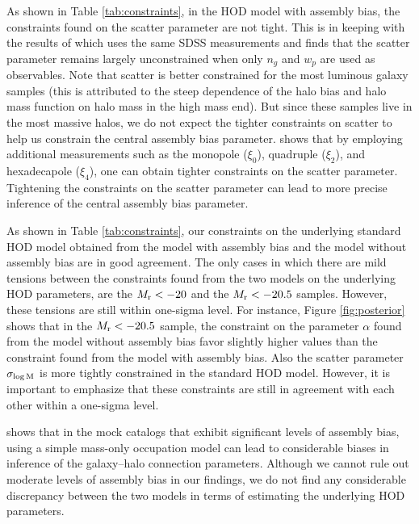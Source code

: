 \documentclass[twocolumn]{aastex61}
\newcommand{\sigmam}{\sigma_{\log \rm M}}
\begin{document}
As shown in Table \ref{tab:constraints}, in the HOD model with assembly bias, the constraints found on the scatter parameter are not tight. This is in keeping with the results of \citet{guo2015} which uses the same SDSS measurements and finds that the scatter parameter remains largely unconstrained when only $n_{g}$ and $w_{p}$ are used as observables. Note that scatter is better constrained for the most luminous galaxy samples (this is attributed to the steep dependence of the halo bias and halo mass function on halo mass in the high mass end). But since these samples live in the most massive halos, we do not expect the tighter constraints on scatter to help us constrain the central assembly bias parameter. \citet{guo2015} shows that by employing additional measurements such as the monopole ($\xi_{0}$), quadruple ($\xi_{2}$), and hexadecapole ($\xi_{4}$), one can obtain tighter constraints on the scatter parameter. Tightening the constraints on the scatter parameter can lead to more precise inference of the central assembly bias parameter.    

As shown in Table \ref{tab:constraints}, our constraints on the underlying standard HOD model obtained from the model with assembly bias and the model without assembly bias are in good agreement. The only cases in which there are mild tensions between the constraints found from the two models on the underlying HOD parameters, are the $M_{\rm r}<-20$ and the $M_{\rm r}<-20.5$ samples. However, these tensions are still within one-sigma level. For instance, Figure \ref{fig:posterior} shows that in the $M_{\rm r}<-20.5$ sample, the constraint on the parameter $\alpha$ found from the model without assembly bias favor slightly higher values than the constraint found from the model with assembly bias. Also the scatter parameter $\sigmam$ is more tightly constrained in the standard HOD model. However, it is important to emphasize that these constraints are still in agreement with each other within a one-sigma level. 

\citet{arz2014} shows that in the mock catalogs that exhibit significant levels of assembly bias, using a simple mass-only occupation model can lead to considerable biases in inference of the galaxy--halo connection parameters. Although we cannot rule out moderate levels of assembly bias in our findings, we do not find any considerable discrepancy between the two models in terms of estimating the underlying HOD parameters. 
 
\end{document}
